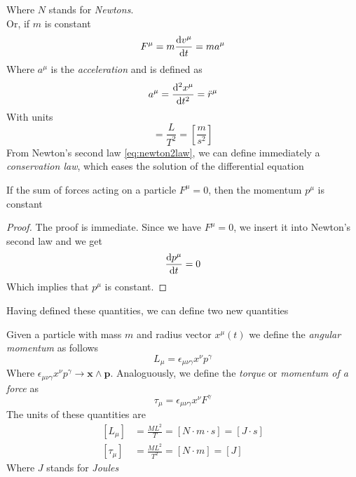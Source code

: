 \documentclass[../admech.tex]{subfiles}
\begin{document}
Where $N$ stands for \emph{Newtons}.\\
Or, if $m$ is constant
\begin{equation}
	F^\mu=m\derivative{v^\mu}{t}=ma^\mu
	\label{eq:newton2lawcoma}
\end{equation}
Where $a^\mu$ is the \emph{acceleration} and is defined as
\begin{equation*}
	a^\mu=\derivative[2]{x^\mu}{t}=\ddot{r}^\mu
\end{equation*}
With units
\begin{equation*}
	[a^\mu]=\frac{L}{T^2}=\left[\frac{m}{s^2}\right]
\end{equation*}
From Newton's second law \eqref{eq:newton2law}, we can define immediately a \emph{conservation law}, which eases the solution of the differential equation
\begin{thm}
	If the sum of forces acting on a particle $F^\mu=0$, then the momentum $p^\mu$ is constant
\end{thm}
\begin{proof}
	The proof is immediate. Since we have $F^\mu=0$, we insert it into Newton's second law and we get
	\begin{equation*}
		\derivative{p^\mu}{t}=0
	\end{equation*}
	Which implies that $p^\mu$ is constant.
\end{proof}
Having defined these quantities, we can define two new quantities
\begin{dfn}
	Given a particle with mass $m$ and radius vector $x^\mu(t)$ we define the \emph{angular momentum} as follows
	\begin{equation}
		L_\mu=\epsilon_{\mu\nu\gamma}x^\nu p^\gamma
		\label{eq:angularmom}
	\end{equation}
	Where $\epsilon_{\mu\nu\gamma}x^\nu p^\gamma\to\mathbf{x}\wedge\mathbf{p}$.
	Analoguously, we define the \emph{torque} or \emph{momentum of a force} as
	\begin{equation*}
		\tau_\mu=\epsilon_{\mu\nu\gamma}x^\nu F^\gamma
	\end{equation*}
	The units of these quantities are
	\begin{equation*}
		\begin{aligned}
			[L_\mu]&=\frac{ML^2}{T}=[N\cdot m\cdot s]=[J\cdot s]\\
			[\tau_\mu]&=\frac{ML^2}{T^2}=[N\cdot m]=[J]
		\end{aligned}
	\end{equation*}
	Where $J$ stands for \emph{Joules}
\end{dfn}
\end{document}
